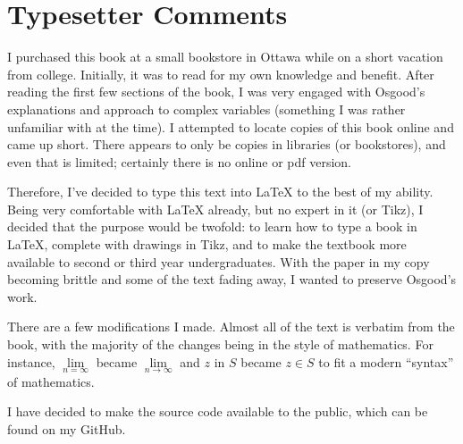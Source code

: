\documentclass[twosided]{memoir}
\begin{document}
\chapter*{Typesetter Comments}
I purchased this book at a small bookstore in Ottawa while on a short vacation from college. Initially, it was to read for my own knowledge and benefit. After reading the first few sections of the book, I was very engaged with Osgood's explanations and approach to complex variables (something I was rather unfamiliar with at the time). I attempted to locate copies of this book online and came up short. There appears to only be copies in libraries (or bookstores), and even that is limited; certainly there is no online or pdf version. 

Therefore, I've decided to type this text into LaTeX to the best of my ability. Being very comfortable with LaTeX already, but no expert in it (or Tikz), I decided that the purpose would be twofold: to learn how to type a book in LaTeX, complete with drawings in Tikz, and to make the textbook more available to second or third year undergraduates. With the paper in my copy becoming brittle and some of the text fading away, I wanted to preserve Osgood's work. 

There are a few modifications I made. Almost all of the text is verbatim from the book, with the majority of the changes being in the style of mathematics. For instance, $\lim\limits_{n=\infty} $ became $\lim\limits_{n \to \infty} $ and $z \text{ in } S$ became $z\in S$ to fit a modern ``syntax'' of mathematics. 



I have decided to make the source code available to the public, which can be found on my GitHub. 
\end{document}
